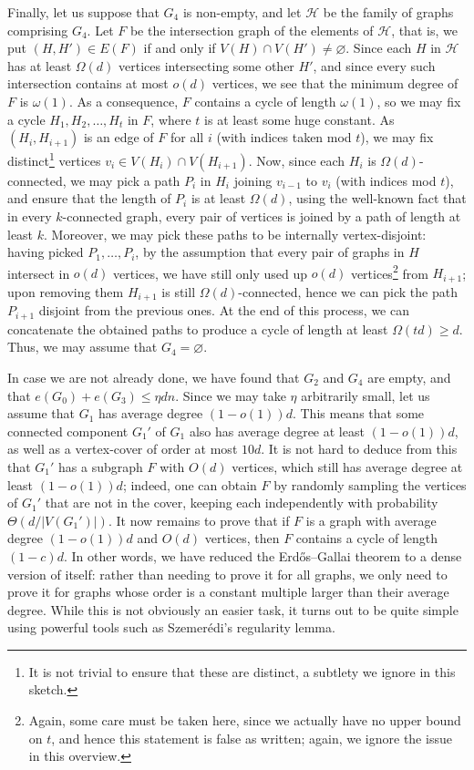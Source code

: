 \documentclass[10pt]{article}
\theoremstyle{definition}
\newcommand\ab[1]{\lvert#1\rvert}
\let\leq\leqslant
\let\geq\geqslant
\begin{document}
Finally, let us suppose that $G_4$ is non-empty, and let $\mathcal H$ be the family of graphs comprising $G_4$. Let $F$ be the intersection graph of the elements of $\mathcal H$, that is, we put $(H,H') \in E(F)$ if and only if $V(H) \cap V(H') \neq \varnothing$. Since each $H$ in $\mathcal H$ has at least $\Omega(d)$ vertices intersecting some other $H'$, and since every such intersection contains at most $o(d)$ vertices, we see that the minimum degree of $F$ is $\omega(1)$. As a consequence, $F$ contains a cycle of length $\omega(1)$, so we may fix a cycle $H_1,H_2,\dots,H_t$ in $F$, where $t$ is at least some huge constant. As $(H_i,H_{i+1})$ is an edge of $F$ for all $i$ (with indices taken mod $t$), we may fix distinct\footnote{It is not trivial to ensure that these are distinct, a subtlety we ignore in this sketch.} vertices $v_i \in V(H_i)\cap V(H_{i+1})$. Now, since each $H_i$ is $\Omega(d)$-connected, we may pick a path $P_i$ in $H_i$ joining $v_{i-1}$ to $v_i$ (with indices mod $t$), and ensure that the length of $P_i$ is at least $\Omega(d)$, using the well-known fact that in every $k$-connected graph, every pair of vertices is joined by a path of length at least $k$. Moreover, we may pick these paths to be internally vertex-disjoint: having picked $P_1,\dots,P_i$, by the assumption that every pair of graphs in $H$ intersect in $o(d)$ vertices, we have still only used up $o(d)$ vertices\footnote{Again, some care must be taken here, since we actually have no upper bound on $t$, and hence this statement is false as written; again, we ignore the issue in this overview.} from $H_{i+1}$; upon removing them $H_{i+1}$ is still $\Omega(d)$-connected, hence we can pick the path $P_{i+1}$ disjoint from the previous ones. At the end of this process, we can concatenate the obtained paths to produce a cycle of length at least $\Omega(td)\geq d$. Thus, we may assume that $G_4 = \varnothing$.

In case we are not already done, we have found that $G_2$ and $G_4$ are empty, and that $e(G_0)+e(G_3) \leq \eta dn$. Since we may take $\eta$ arbitrarily small, let us assume that $G_1$ has average degree $(1-o(1))d$. This means that some connected component $G_1'$ of $G_1$ also has average degree at least $(1-o(1))d$, as well as a vertex-cover of order at most $10d$. It is not hard to deduce from this that $G_1'$ has a subgraph $F$ with $O(d)$ vertices, which still has average degree at least $(1-o(1))d$; indeed, one can obtain $F$ by randomly sampling the vertices of $G_1'$ that are not in the cover, keeping each independently with probability $\Theta(d/\ab{V(G_1')})$. It now remains to prove that if $F$ is a graph with average degree $(1-o(1))d$ and $O(d)$ vertices, then $F$ contains a cycle of length $(1-c)d$. In other words, we have reduced the Erd\H os--Gallai theorem to a dense version of itself: rather than needing to prove it for all graphs, we only need to prove it for graphs whose order is a constant multiple larger than their average degree. While this is not obviously an easier task, it turns out to be quite simple using powerful tools such as Szemer\'edi's regularity lemma.
\end{document}
